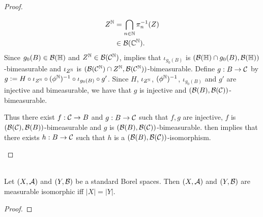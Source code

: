 \documentclass{book}
\begin{document}
\begin{proof}
\begin{enumerate}
\begin{itemize}
				\begin{align*}
					Z^{\mathbb{N}}
					& = \bigcap\limits_{n \in \mathbb{N}} \pi_n^{-1}(Z) \\
					& \in \mathcal{B}(\mathbb{C}^{\mathbb{N}}).
				\end{align*} 
				Since $g_0(B) \in \mathcal{B}(\mathbb{H})$ and $Z^{\mathbb{N}} \in \mathcal{B}(\mathcal{C}^{\mathbb{N}})$,  implies that $\iota_{g_0(B)}$ is $(\mathcal{B}(\mathbb{H}) \cap g_0(B), \mathcal{B}(\mathbb{H}))$-bimeasurable and $\iota_{Z^{\mathbb{N}}}$ is $(\mathcal{B}(\mathcal{C}^{\mathbb{N}}) \cap Z^{\mathbb{N}}, \mathcal{B}(\mathcal{C}^{\mathbb{N}}))$-bimeasurable. Define $g:B \rightarrow \mathcal{C}$ by $g \vcentcolon= H \circ \iota_{Z^{\mathbb{N}}} \circ (\phi^{\mathbb{N}})^{-1} \circ \iota_{g_0(B)} \circ g'$. Since $H$, $\iota_{Z^{\mathbb{N}}}$, $(\phi^{\mathbb{N}})^{-1}$, $\iota_{g_0(B)}$ and $g'$ are injective and bimeasurable, we have that $g$ is injective and $(\mathcal{B}(B), \mathcal{B}(\mathcal{C}))$-bimeasurable. 
			\end{itemize}
			Thus there exist $f: \mathcal{C} \rightarrow B$ and $g: B \rightarrow \mathcal{C}$ such that $f,g$ are injective, $f$ is $(\mathcal{B}(\mathcal{C}), \mathcal{B}(B))$-bimeasurable and $g$ is $(\mathcal{B}(B), \mathcal{B}(\mathcal{C}))$-bimeasurable.  then implies that there exists $h: B \rightarrow \mathcal{C}$ such that $h$ is a $(\mathcal{B}(B), \mathcal{B}(\mathcal{C}))$-isomorphism.
		\end{enumerate}
	\end{proof}
	
	\begin{ex}   \\
		Let $(X, \mathcal{A})$ and $(Y, \mathcal{B})$ be a standard Borel spaces. Then $(X, \mathcal{A})$ and $(Y, \mathcal{B})$ are measurable isomorphic iff $|X| = |Y|$. 
	\end{ex}
	
	\begin{proof}
	\end{proof}
	
	
	
	
	
	
	
	
	
	
	
	
	
	
	
	
	
	
	
	
	
	
	
	
	
	
	
	
	
	
	
\end{document}
